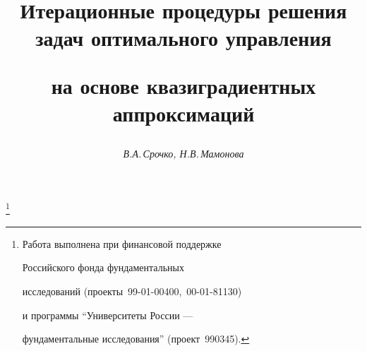 




% 


\newcommand{\Int}{\operatorname{int}}


\newcommand{\sign}{\operatorname{sign}}


\newcommand{\tts}[1]{}







\setcounter{page}{55}















\author{\it В.А.\,Срочко, Н.В.\,Мамонова}




\title{Итерационные процедуры решения задач оптимального управления


на основе квазиградиентных аппроксимаций}


\thanks{Работа выполнена при финансовой поддержке


Российского фонда фундаментальных


исследований (проекты \No\,99-01-00400, \No\,00-01-81130)


и программы ``Университеты России ---


фундаментальные исследования'' (проект \No\,990345). }





\date{}




\pagestyle{plain} %





